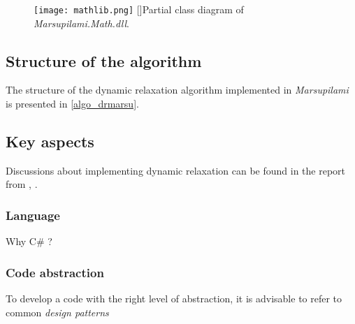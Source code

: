 \begin{figure}[t]
     	\centering
	\texttt{[image: mathlib.png]}
	[]{Partial class diagram of \textit{Marsupilami.Math.dll}.}
	\label{fig:mathlib} 
\end{figure}


\subsection{Structure of the algorithm}
The structure of the dynamic relaxation algorithm implemented in \emph{Marsupilami} is presented in \cref{algo_drmarsu}.

\IncMargin{2em}
\begin{figure}[p]
\begin{fullpage}
	
\end{fullpage}
\end{figure}
\DecMargin{2em}


\subsection{Key aspects}
Discussions about implementing dynamic relaxation can be found in the report from , .

\subsubsection{Language}
Why C\# ? 

\subsubsection{Code abstraction}
To develop a code with the right level of abstraction, it is advisable to refer to common \emph{design patterns} \cite{Bishop2008, Clune2012}


